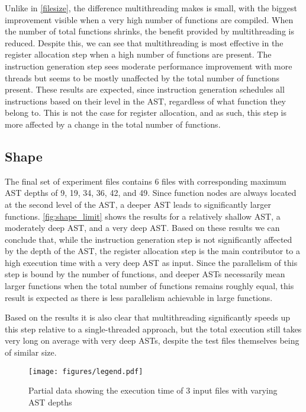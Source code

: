 \documentclass[11pt,dvipsnames]{article}
\begin{document}
Unlike in \autoref{filesize}, the difference multithreading makes is small, with the biggest improvement visible when a very high number of functions are compiled. When the number of total functions shrinks, the benefit provided by multithreading is reduced. Despite this, we can see that multithreading is most effective in the register allocation step when a high number of functions are present. The instruction generation step sees moderate performance improvement with more threads but seems to be mostly unaffected by the total number of functions present. These results are expected, since instruction generation schedules all instructions based on their level in the AST, regardless of what function they belong to. This is not the case for register allocation, and as such, this step is more affected by a change in the total number of functions.

\subsection{Shape} \label{shape}
The final set of experiment files contains 6 files with corresponding maximum AST depths of 9, 19, 34, 36, 42, and 49. Since function nodes are always located at the second level of the AST, a deeper AST leads to significantly larger functions. \autoref{fig:shape_limit} shows the results for a relatively shallow AST, a moderately deep AST, and a very deep AST. Based on these results we can conclude that, while the instruction generation step is not significantly affected by the depth of the AST, the register allocation step is the main contributor to a high execution time with a very deep AST as input. Since the parallelism of this step is bound by the number of functions, and deeper ASTs necessarily mean larger functions when the total number of functions remains roughly equal, this result is expected as there is less parallelism achievable in large functions.

Based on the results it is also clear that multithreading significantly speeds up this step relative to a single-threaded approach, but the total execution still takes very long on average with very deep ASTs, despite the test files themselves being of similar size.

\begin{figure}[!ht]
    \centering
    \texttt{[image: figures/legend.pdf]}
    \caption{Partial data showing the execution time of 3 input files with varying AST depths}
    \label{fig:shape_limit}
\end{figure}
\end{document}
